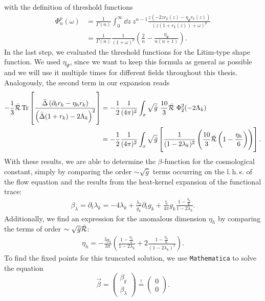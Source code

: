 with the definition of threshold functions 
\begin{equation}
\begin{aligned}
	\Phi_n^p(\omega) &= \frac{1}{\Gamma(n)}\int_0^{\infty}\dd z \ z^{n-1} \frac{z(-2zr_k(z)-\eta_{\Psi}r_k(z))}{(z(1+r_k(z))+\omega)^p}\\[10pt] 
	&= \frac{1}{\Gamma(n)}\frac{1}{\left(1+\omega\right)^p}\left(\frac{2}{n} - \frac{\eta_{\Psi}}{n(n+1)}\right).
\end{aligned}
\label{eqn:threshold}
\end{equation}
In the last step, we evaluated the threshold functions for the Litim-type shape function. We used $\eta_\Psi$, since we want to keep this formula as general as possible and we will use it multiple times for different fields throughout this thesis. Analogously, the second term in our expansion reads
\begin{align}
	-\frac{1}{3}\bar{\mathcal{R}}\operatorname{Tr}\left[\frac{\bar{\Delta}\left(\partial_t r_k - \eta_h r_k\right)}{\left(\bar{\Delta}(1+r_k)-2\Lambda_k\right)^2}\right] &= -\frac{1}{2}\frac{1}{(4\pi)^2}\int_x \sqrt{\bar{g}} \ \frac{10}{3}\bar{\Ricci}\ \Phi_2^2(-2\Lambda_k)\\
	&=  -\frac{1}{2}\frac{1}{(4\pi)^2}\int_x \sqrt{\bar{g}}\left[\frac{1}{(1-2\lambda_k)^2}\left( \frac{10}{3}\bar{\Ricci}\left(1-\frac{\eta_h}{6}\right)\right)\right].\nonumber
	\label{eqn:hk42}
\end{align}
With these results, we are able to determine the $\beta$-function for the cosmological constant, simply by comparing the order $\sim\sqrt{\bar{g}}$ terms occurring on the l.\,h.\,s. of the flow equation and the results from the heat-kernel expansion of the functional trace:
\begin{align}
	\beta_{\lambda} = \partial_t\lambda_k = -4\lambda_k + \frac{\lambda_k}{g_k} \partial_t g_k + \frac{5}{4\pi}g_k\frac{1-\frac{\eta_h}{6}}{1-2\lambda_k}.
\end{align}
Additionally, we find an expression for the anomalous dimension $\eta_h$ by comparing the terms of order $\sim\sqrt{\bar{g}}\bar{\mathcal{R}}$:
\begin{align}
\eta_h = -\frac{5g_k}{3\pi} \left(\frac{1-\frac{\eta_h}{4}}{1-2\lambda_k} + 2\frac{1-\frac{\eta_h}{6}}{(1-2\lambda_k)^2}\right).	
\end{align}
To find the fixed points for this truncated solution, we use \verb|Mathematica| to solve the equation
\begin{equation}
	\vec{\beta} = \begin{pmatrix}\beta_g\\ \beta_{\lambda}\end{pmatrix} \overset{!}{=}  \begin{pmatrix}0\\ 0\end{pmatrix}.
\end{equation}
